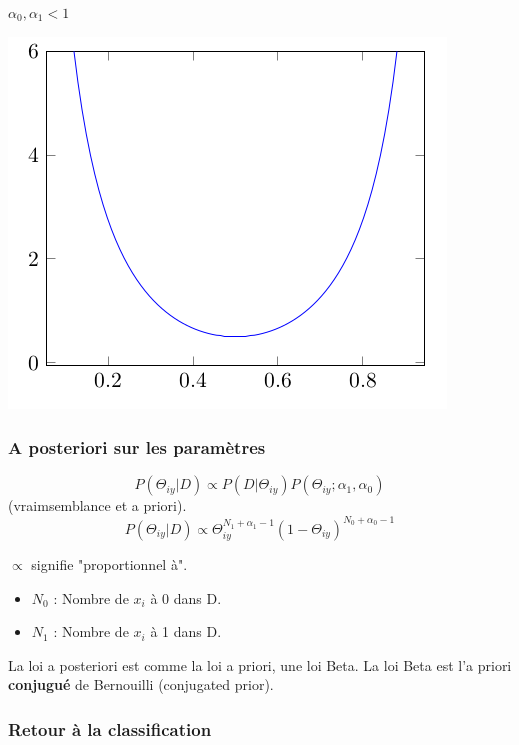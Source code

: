 \documentclass{article}
\begin{document}
\begin{itemize}
$\alpha_0, \alpha_1 < 1$

\includegraphics[scale=0.4]{schema3.png}

\end{itemize}

\subsubsection{A posteriori sur les paramètres}

\[ P(\Theta_{iy} | D) \propto P(D | \Theta_{iy}) P(\Theta_{iy}; \alpha_1, \alpha_0) \] (vraimsemblance et a priori).
\[ P(\Theta_{iy} | D) \propto \Theta_{iy}^{N_1 + \alpha_1 - 1} (1 - \Theta_{iy})^{N_0 + \alpha_0 - 1} \]

$\propto$ signifie "proportionnel à".

\begin{itemize}
\item $N_0$ : Nombre de $x_i$ à 0 dans D.
\item $N_1$ : Nombre de $x_i$ à 1 dans D.
\end{itemize}

La loi a posteriori est comme la loi a priori, une loi Beta. La loi Beta est l'a priori \textbf{conjugué} de Bernouilli (conjugated prior).

\subsubsection{Retour à la classification}
\end{document}
